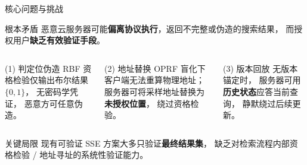 \begin{frame}{核心问题与挑战}

  \begin{alertblock}{根本矛盾}
    恶意云服务器可能\textbf{偏离协议执行}，返回不完整或伪造的搜索结果，
    而授权用户\textbf{缺乏有效验证手段}。
  \end{alertblock}

  \vspace{0.5em}

  \begin{columns}[T]
      \begin{block}{(1) 判定位伪造}
        \small
        RBF 资格检验仅输出布尔结果 $\{0,1\}$，
        无密码学凭证，
        恶意方可任意伪造。
      \end{block}
      \begin{block}{(2) 地址替换}
        \small
        OPRF 盲化下客户端无法重算物理地址；
        服务器可将采样地址替换为\textbf{未授权位置}，
        绕过资格检验。
      \end{block}
      \begin{block}{(3) 版本回放}
        \small
        无版本锚定时，
        服务器可用\textbf{历史状态}应答当前查询，
        静默绕过后续更新。
      \end{block}
  \end{columns}

  \vspace{0.5em}

  \begin{exampleblock}{关键局限}
    现有可验证 SSE 方案大多只验证\textbf{最终结果集}，
    缺乏对检索流程内部资格检验 / 地址寻址的系统性验证能力。
  \end{exampleblock}

\end{frame}

